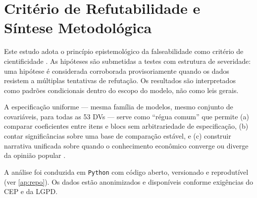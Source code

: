 \section{Critério de Refutabilidade e Síntese Metodológica}

Este estudo adota o princípio epistemológico da falseabilidade como critério de cientificidade \cite{popperlogic}. As hipóteses são submetidas a testes com estrutura de severidade: uma hipótese é considerada corroborada provisoriamente quando os dados resistem a múltiplas tentativas de refutação. Os resultados são interpretados como padrões condicionais dentro do escopo do modelo, não como leis gerais.

A especificação uniforme — mesma família de modelos, mesmo conjunto de covariáveis, para todas as 53 DVs — serve como ``régua comum'' que permite (a) comparar coeficientes entre itens e blocs sem arbitrariedade de especificação, (b) contar significâncias sobre uma base de comparação estável, e (c) construir narrativa unificada sobre quando o conhecimento econômico converge ou diverge da opinião popular \cite{stigum2003}.

A análise foi conduzida em \texttt{Python} com código aberto, versionado e reprodutível (ver \autoref{ap:repo}). Os dados estão anonimizados e disponíveis conforme exigências do CEP e da LGPD.
